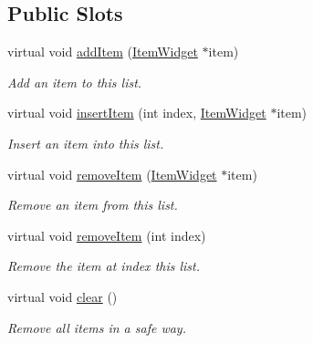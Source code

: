 \subsection*{Public Slots}
\begin{DoxyCompactItemize}
\item 
virtual void \hyperlink{class_u_i_1_1_item_list_widget_ab1661803ad3ffe6271d7379b6566e898}{add\-Item} (\hyperlink{class_u_i_1_1_item_widget}{Item\-Widget} $\ast$item)
\begin{DoxyCompactList}\small\item\em Add an item to this list. \end{DoxyCompactList}\item 
virtual void \hyperlink{class_u_i_1_1_item_list_widget_a707a74054168f10acc5da4944b31a76a}{insert\-Item} (int index, \hyperlink{class_u_i_1_1_item_widget}{Item\-Widget} $\ast$item)
\begin{DoxyCompactList}\small\item\em Insert an item into this list. \end{DoxyCompactList}\item 
virtual void \hyperlink{class_u_i_1_1_item_list_widget_a515cd5198e8eab9d10c06e9be42b488d}{remove\-Item} (\hyperlink{class_u_i_1_1_item_widget}{Item\-Widget} $\ast$item)
\begin{DoxyCompactList}\small\item\em Remove an item from this list. \end{DoxyCompactList}\item 
virtual void \hyperlink{class_u_i_1_1_item_list_widget_a3feab22ce14c3abaa79741a1ebf0b288}{remove\-Item} (int index)
\begin{DoxyCompactList}\small\item\em Remove the item at {\ttfamily index} this list. \end{DoxyCompactList}\item 
virtual void \hyperlink{class_u_i_1_1_item_list_widget_af440f169ac88cfc41758cc4afc0ce496}{clear} ()
\begin{DoxyCompactList}\small\item\em Remove all items in a safe way. \end{DoxyCompactList}\end{DoxyCompactItemize}
